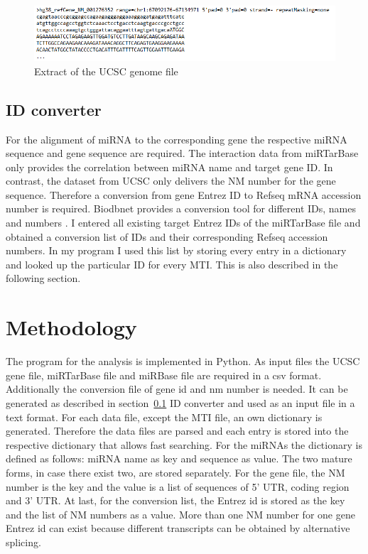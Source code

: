 \documentclass[12pt,  a4paper]{report}
\begin{document}
\begin{figure}[h]
\centering
\includegraphics[width=\textwidth]{results/ucsc.png}
\caption{Extract of the UCSC genome file}
\label{ucsc_scrot}
\end{figure}



\subsection{ID converter}
\label{sec:id}
For the alignment of miRNA to the corresponding gene the respective miRNA sequence and gene sequence are required. The interaction data from miRTarBase only provides the correlation between miRNA name and target gene ID. In contrast, the dataset from UCSC only delivers the NM number for the gene sequence. Therefore a conversion from gene Entrez ID to Refseq mRNA accession number is required. Biodbnet provides a conversion tool for different IDs, names and numbers \cite{biodb}. I entered all existing target Entrez IDs of the miRTarBase file and obtained a conversion list of IDs and their corresponding Refseq accession numbers. In my program I used this list by storing every entry in a dictionary and looked up the particular ID for every MTI. This is also described in the following section.
 


\vspace{1cm}


\section{Methodology}
\label{sec:meth}


The program for the analysis is implemented in Python. As input files the UCSC gene file, miRTarBase file and miRBase file are required in a csv format. Additionally the conversion file of gene id and nm number is needed. It can be generated as described in section~\ref{sec:id} ID converter and used as an input file in a text format. 
For each data file, except the MTI file, an own dictionary is generated. Therefore the data files are parsed and each entry is stored into the respective dictionary that allows fast searching. For the miRNAs the dictionary is defined as follows: miRNA name as key and sequence as value. The two mature forms, in case there exist two, are stored separately. For the gene file, the NM number is the key and the value is a list of sequences of 5' UTR, coding region and 3' UTR. At last, for the conversion list, the Entrez id is stored as the key and the list of NM numbers as a value. More than one NM number for one gene Entrez id can exist because different transcripts can be obtained by alternative splicing. \\
\end{document}

